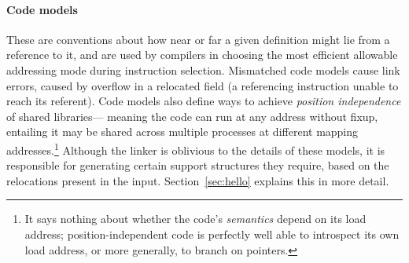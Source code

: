 \paragraph{Code models} These are conventions about 
how near or far a given definition might lie from a reference to it, 
and are used by compilers in choosing the most efficient allowable addressing mode
during instruction selection.
Mismatched code models cause link errors, caused by overflow in a relocated field 
(a referencing instruction unable to reach its referent).
Code models also define ways to achieve \emph{position independence} of shared libraries---
meaning the code can run at any address without fixup,
entailing it may be shared across multiple processes at different mapping addresses.\footnote{It says nothing about
whether the code's \emph{semantics} depend on its load address; 
position-independent code is perfectly well able to 
introspect its own load address, or more generally, to branch on pointers.}
Although the linker is oblivious to the details of these models, 
it is responsible for generating certain support structures they require,
based on the relocations present in the input.
Section~\ref{sec:hello} explains this in more detail.


